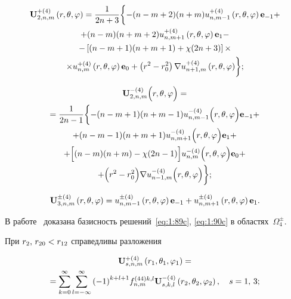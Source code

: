 \begin{russian}
\begin{multline}\label{eq:1:92}
{\bf{U}}_{2,n,m}^{ + (4)}\left( {r,\theta ,\varphi } \right) = \frac{1}{{2n + 3}}\bigg\{ { - (n - m + 2)(n + m)u_{n,m - 1}^{ + (4)}\left( {r,\theta ,\varphi } \right){{\bf{e}}_{ - 1}} + } \\
+ (n - m)(n + m + 2)u_{n,m + 1}^{ + (4)}\left( {r,\theta ,\varphi } \right){{\bf{e}}_1} - \\
- \left[ {(n - m + 1)(n + m + 1) + \chi (2n + 3)} \right] \times \\
{ \times u_{n,m}^{ + (4)}\left( {r,\theta ,\varphi } \right){{\bf{e}}_0} + \left( {{r^2} - r_0^2} \right)\nabla u_{n + 1,m}^{ + (4)}\left( {r,\theta ,\varphi } \right)} \bigg\};
\end{multline}

\begin{multline}\label{eq:1:93}
{\bf{U}}_{2,n,m}^{ - (4)}\Big( {r,\theta ,\varphi } \Big) = \\
= \frac{1}{{2n - 1}}\bigg\{ { - (n - m + 1)(n + m - 1)u_{n,m - 1}^{ - (4)}\Big( {r,\theta ,\varphi } \Big){{\bf{e}}_{ - 1}} + } \\
+ (n - m - 1)(n + m + 1)u_{n,m + 1}^{ - (4)}\Big( {r,\theta ,\varphi } \Big){{\bf{e}}_1} + \\
+ \Big[ {(n - m)(n + m) - \chi (2n - 1)} \Big] u_{n,m}^{ - (4)}\Big( {r,\theta ,\varphi } \Big){{\bf{e}}_0} + \\
+ \Big( {{r^2} - r_0^2} \Big)\nabla u_{n - 1,m}^{ - (4)}\Big( {r,\theta ,\varphi } \Big) \bigg\};
\end{multline}

\begin{equation}\label{eq:1:94}
{\bf{U}}_{3,n,m}^{ \pm (4)}\left( {r,\theta ,\varphi } \right) =  u_{n,m - 1}^{ \pm (4)}\left( {r,\theta ,\varphi } \right){{\bf{e}}_{ - 1}} + u_{n,m + 1}^{ \pm (4)}\left( {r,\theta ,\varphi } \right){{\bf{e}}_1}.
\end{equation}

В работе~\cite{Nikolaev1998} доказана базисность решений~\eqref{eq:1:89c}, \eqref{eq:1:90c} в областях~$\Omega_4^\pm$.

\begin{theorem}
При ${r_2},{\mkern 1mu} {\kern 1pt} {r_{20}} < {r_{12}}$ справедливы разложения

\begin{multline}\label{eq:1:95}
{\bf{U}}_{s,n,m}^{ + (4)}\left( {{r_1},{\theta _1},{\varphi _1}} \right) = \\
= \sum\limits_{k = 0}^\infty  {\sum\limits_{l =  - \infty }^\infty  {{{( - 1)}^{k + l + 1}}} } f_{n,m}^{(44)k,l}{\bf{U}}_{s,k,l}^{ - (4)}\left( {{r_2},{\theta _2},{\varphi _2}} \right), \quad s = 1,\,3;
\end{multline}


\end{theorem}
\end{russian}
